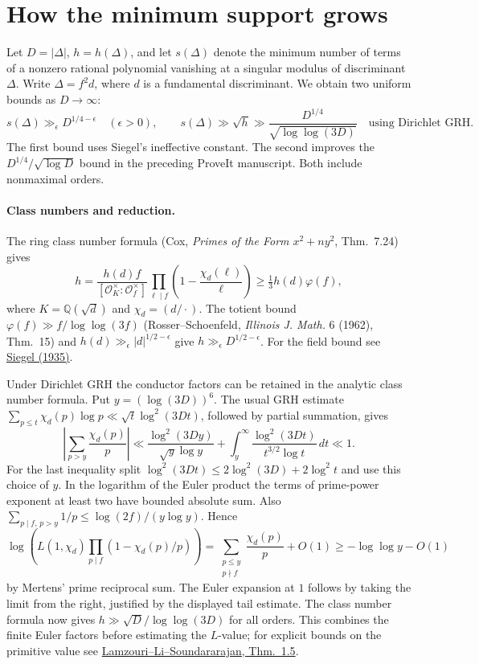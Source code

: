 \section{How the minimum support grows}

Let $D=|\Delta|$, $h=h(\Delta)$, and let $s(\Delta)$ denote the minimum
number of terms of a nonzero rational polynomial vanishing at a singular
modulus of discriminant $\Delta$. Write $\Delta=f^2 d$, where $d$ is a
fundamental discriminant. We obtain two uniform bounds as $D\to\infty$:
\[
 s(\Delta)\gg_{\epsilon}D^{1/4-\epsilon}\quad(\epsilon>0),
 \qquad
 s(\Delta)\gg\sqrt h\gg\frac{D^{1/4}}{\sqrt{\log\log(3D)}}
 \quad\text{using Dirichlet GRH}.
\]
The first bound uses Siegel's ineffective constant. The second improves the
$D^{1/4}/\sqrt{\log D}$ bound in the preceding ProveIt manuscript. Both
include nonmaximal orders.

\paragraph{Class numbers and reduction.}
The ring class number formula (Cox, \emph{Primes of the Form
$x^2+ny^2$}, Thm.~7.24) gives
\[
 h=\frac{h(d)f}{[\mathcal O_K^\times:\mathcal O_f^\times]}
       \prod_{\ell\mid f}\left(1-\frac{\chi_d(\ell)}\ell\right)
   \ge \tfrac13 h(d)\varphi(f),
\]
where $K=\mathbb Q(\sqrt d)$ and $\chi_d=(d/\cdot)$.
The totient bound $\varphi(f)\gg f/\log\log(3f)$
(Rosser--Schoenfeld, \emph{Illinois J. Math.} 6 (1962), Thm.~15)
and $h(d)\gg_\epsilon |d|^{1/2-\epsilon}$ give
$h\gg_\epsilon D^{1/2-\epsilon}$. For the field
bound see \href{https://doi.org/10.4064/aa-1-1-83-86}{Siegel (1935)}.

Under Dirichlet GRH the conductor factors can be retained in the analytic
class number formula. Put $y=(\log(3D))^6$. The usual GRH estimate
$\sum_{p\le t}\chi_d(p)\log p\ll\sqrt t\log^2(3Dt)$, followed by
partial summation, gives
\[
 \left|\sum_{p>y}\frac{\chi_d(p)}p\right|
 \ll \frac{\log^2(3Dy)}{\sqrt y\log y}
       +\int_y^\infty\frac{\log^2(3Dt)}{t^{3/2}\log t}\,dt
 \ll 1 .
\]
For the last inequality split $\log^2(3Dt)\le
2\log^2(3D)+2\log^2 t$ and use this choice of $y$.
In the logarithm of the Euler product the terms of prime-power exponent at
least two have bounded absolute sum. Also
$\sum_{p\mid f,\,p>y}1/p\le\log(2f)/(y\log y)$. Hence
\[
 \log\!\left(L(1,\chi_d)\prod_{p\mid f}
       (1-\chi_d(p)/p)\right)
 =\sum_{\substack{p\le y\\p\nmid f}}\frac{\chi_d(p)}p+O(1)
 \ge-\log\log y-O(1)
\]
by Mertens' prime reciprocal sum. The Euler expansion at $1$ follows by
taking the limit from the right, justified by the displayed tail estimate.
The class number formula now gives $h\gg\sqrt D/\log\log(3D)$ for all
orders. This combines the finite Euler factors before estimating the
$L$-value; for explicit bounds on the primitive value see
\href{https://arxiv.org/abs/1309.3595}{Lamzouri--Li--Soundararajan,
Thm.~1.5}.

